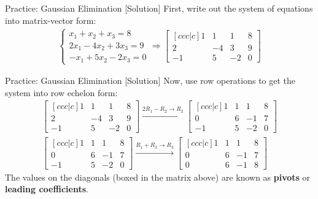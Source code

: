 \begin{frame}{Practice: Gaussian Elimination [Solution]}
    First, write out the system of equations into matrix-vector form:
    \begin{align*}
        \begin{cases}
            x_1 + x_2 + x_3 = 8 \\
            2x_1 - 4x_2 + 3x_3 = 9 \\
            -x_1 + 5x_2 - 2x_3 = 0
        \end{cases} \Longrightarrow
        \begin{bmatrix}[c c c | c]
            1 & 1 & 1 & 8 \\
            2 & -4 & 3 & 9 \\
            -1 & 5 & -2 & 0
        \end{bmatrix}
    \end{align*}
\end{frame}

\begin{frame}{Practice: Gaussian Elimination [Solution]}
    Now, use row operations to get the system into row echelon form:
    \begin{align*}
        \begin{bmatrix}[c c c | c]
            1 & 1 & 1 & 8 \\
            2 & -4 & 3 & 9 \\
            -1 & 5 & -2 & 0
        \end{bmatrix}
        \xrightarrow[]{2R_1 - R_2 \to R_2}
        \begin{bmatrix}[c c c | c]
            1 & 1 & 1 & 8 \\
            0 & 6 & -1 & 7 \\
            -1 & 5 & -2 & 0
        \end{bmatrix} \\[0.8ex]
        \begin{bmatrix}[c c c | c]
            1 & 1 & 1 & 8 \\
            0 & 6 & -1 & 7 \\
            -1 & 5 & -2 & 0
        \end{bmatrix}
        \xrightarrow[]{R_1 + R_3 \to R_3}
        \begin{bmatrix}[c c c | c]
            \boxed{1} & 1 & 1 & 8 \\
            0 & \boxed{6} & -1 & 7 \\
            0 & 6 & -1 & 8
        \end{bmatrix}
    \end{align*}
    The values on the diagonals (boxed in the matrix above) are known as \textbf{pivots} or \textbf{leading coefficients}.
\end{frame}


